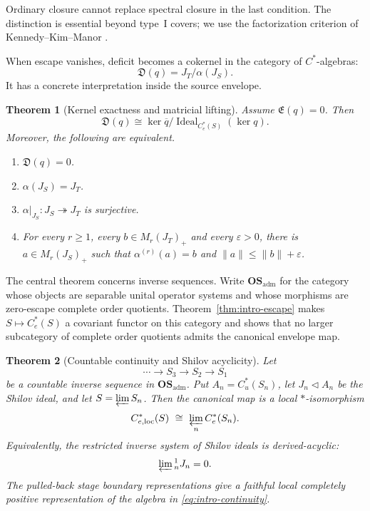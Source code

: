 \documentclass[11pt,a4paper]{amsart}
\theoremstyle{plain}
\newtheorem{theorem}{Theorem}[section]
\theoremstyle{definition}
\newcommand{\Cu}{C_u^*}
\newcommand{\Ce}{C_e^*}
\newcommand{\Celoc}{C_{e,\mathrm{loc}}^*}
\newcommand{\OSadm}{\mathbf{OS}_{\mathrm{adm}}}
\newcommand{\Esc}{\mathfrak E}
\newcommand{\Def}{\mathfrak D}
\newcommand{\Ideal}{\operatorname{Ideal}}
\begin{document}
Ordinary closure cannot replace spectral closure in the last condition.  The distinction is
essential beyond type~I covers; we use the factorization criterion of Kennedy--Kim--Manor
\cite[Proposition~9.2]{KKM2023}.

When escape vanishes, deficit becomes a cokernel in the category of $C^*$-algebras:
\[
 \Def(q)=J_T/\alpha(J_S).
\]
It has a concrete interpretation inside the source envelope.

\begin{theorem}[Kernel exactness and matricial lifting]\label{thm:intro-deficit}
Assume $\Esc(q)=0$.  Then
\begin{equation}\label{eq:deficit-kernel-intro}
 \Def(q)\cong
 \ker\overline q\big/\Ideal_{\Ce(S)}(\ker q).
\end{equation}
Moreover, the following are equivalent.
\begin{enumerate}[label=\textup{(\roman*)}]
\item $\Def(q)=0$.
\item $\alpha(J_S)=J_T$.
\item $\alpha|_{J_S}:J_S\twoheadrightarrow J_T$ is surjective.
\item For every $r\geq1$, every $b\in M_r(J_T)_+$ and every $\varepsilon>0$, there is
      $a\in M_r(J_S)_+$ such that
      $\alpha^{(r)}(a)=b$ and $\|a\|\leq\|b\|+\varepsilon$.
\end{enumerate}
\end{theorem}

The central theorem concerns inverse sequences.  Write $\OSadm$ for the category whose objects are
separable unital operator systems and whose morphisms are zero-escape complete order quotients.
Theorem~\ref{thm:intro-escape} makes $S\mapsto\Ce(S)$ a covariant functor on this category and
shows that no larger subcategory of complete order quotients admits the canonical envelope map.

\begin{theorem}[Countable continuity and Shilov acyclicity]\label{thm:intro-continuity}
Let
\[
 \cdots\longrightarrow S_3\longrightarrow S_2\longrightarrow S_1
\]
be a countable inverse sequence in $\OSadm$.  Put $A_n=\Cu(S_n)$, let $J_n\triangleleft A_n$ be
the Shilov ideal, and let $S=\varprojlim S_n$.  Then the canonical map is a local
$*$-isomorphism
\begin{equation}\label{eq:intro-continuity}
 \Celoc(S)\ \cong\ \varprojlim_n\Ce(S_n).
\end{equation}
Equivalently, the restricted inverse system of Shilov ideals is derived-acyclic:
\begin{equation}\label{eq:intro-acyclic}
 \varprojlim{}^1_nJ_n=0.
\end{equation}
The pulled-back stage boundary representations give a faithful local completely positive
representation of the algebra in \eqref{eq:intro-continuity}.
\end{theorem}
\end{document}
